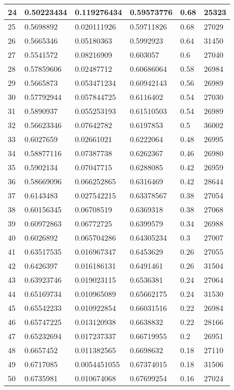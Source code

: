 \begin{longtable}{|l|l|l|l|l|l|}
24 & 0.50223434 & 0.119276434 & 0.59573776 & 0.68 & 25323 \\ \hline 
25 & 0.5698892 & 0.020111926 & 0.59711826 & 0.68 & 27029 \\ \hline 
26 & 0.5665346 & 0.05180363 & 0.5992923 & 0.64 & 31450 \\ \hline 
27 & 0.5541572 & 0.08216909 & 0.603057 & 0.6 & 27040 \\ \hline 
28 & 0.57859606 & 0.02487712 & 0.60686064 & 0.58 & 26984 \\ \hline 
29 & 0.5665873 & 0.053471234 & 0.60942143 & 0.56 & 26989 \\ \hline 
30 & 0.57792944 & 0.057844725 & 0.6116402 & 0.54 & 27030 \\ \hline 
31 & 0.5890937 & 0.055253193 & 0.61510503 & 0.54 & 26989 \\ \hline 
32 & 0.56623346 & 0.07642782 & 0.6197853 & 0.5 & 36002 \\ \hline 
33 & 0.6027659 & 0.02661021 & 0.6222064 & 0.48 & 26995 \\ \hline 
34 & 0.58877116 & 0.07387738 & 0.6262367 & 0.46 & 26980 \\ \hline 
35 & 0.5902134 & 0.07047715 & 0.6288085 & 0.42 & 26959 \\ \hline 
36 & 0.58669096 & 0.066252865 & 0.6316469 & 0.42 & 28644 \\ \hline 
37 & 0.6143483 & 0.027542215 & 0.63378567 & 0.38 & 27054 \\ \hline 
38 & 0.60156345 & 0.06708519 & 0.6369318 & 0.38 & 27068 \\ \hline 
39 & 0.60972863 & 0.06772725 & 0.6399579 & 0.34 & 26988 \\ \hline 
40 & 0.6026892 & 0.065704286 & 0.64305234 & 0.3 & 27007 \\ \hline 
41 & 0.63517535 & 0.016967347 & 0.6453629 & 0.26 & 27055 \\ \hline 
42 & 0.6426397 & 0.016186131 & 0.6491461 & 0.26 & 31504 \\ \hline 
43 & 0.63923746 & 0.019023115 & 0.6536381 & 0.24 & 27064 \\ \hline 
44 & 0.65169734 & 0.010965089 & 0.65662175 & 0.24 & 31530 \\ \hline 
45 & 0.65542233 & 0.010922854 & 0.66031516 & 0.22 & 26984 \\ \hline 
46 & 0.65747225 & 0.013120938 & 0.6638832 & 0.22 & 28166 \\ \hline 
47 & 0.65232694 & 0.017237337 & 0.66719955 & 0.2 & 26951 \\ \hline 
48 & 0.6657452 & 0.011382565 & 0.6698632 & 0.18 & 27110 \\ \hline 
49 & 0.6717085 & 0.0054451055 & 0.67374015 & 0.18 & 31506 \\ \hline 
50 & 0.6735981 & 0.010674068 & 0.67699254 & 0.16 & 27024 \\ \hline 
\end{longtable}